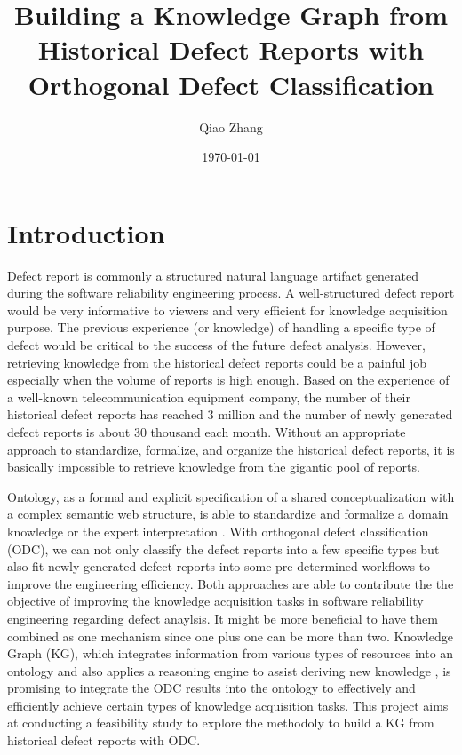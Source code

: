 \documentclass[12pt] {article}
\begin{document}
\title{Building a Knowledge Graph from Historical Defect Reports with Orthogonal Defect Classification}
\author{Qiao Zhang}
\date \today
\maketitle

\thispagestyle{empty}

\bigskip
\pagebreak
\setcounter{page}{1}
\section{Introduction}
Defect report is commonly a structured natural language artifact generated during the software reliability engineering process.
A well-structured defect report would be very informative to viewers and very efficient for knowledge acquisition purpose.
The previous experience (or knowledge) of handling a specific type of defect would be critical to the success of the future defect analysis.
However, retrieving knowledge from the historical defect reports could be a painful job especially when the volume of reports is high enough.
Based on the experience of a well-known telecommunication equipment company, the number of their historical defect reports has reached 3 million and the number of newly generated defect reports is about 30 thousand each month.
Without an appropriate approach to standardize, formalize, and organize the historical defect reports, it is basically impossible to retrieve knowledge from the gigantic pool of reports.\par

Ontology, as a formal and explicit specification of a shared conceptualization with a complex semantic web structure, is able to standardize and formalize a domain knowledge or the expert interpretation \cite{christina2016an}.
With orthogonal defect classification (ODC), we can not only classify the defect reports into a few specific types but also fit newly generated defect reports into some pre-determined workflows to improve the engineering efficiency.
Both approaches are able to contribute the the objective of improving the knowledge acquisition tasks in software reliability engineering regarding defect anaylsis. 
It might be more beneficial to have them combined as one mechanism since one plus one can be more than two.
Knowledge Graph (KG), which integrates information from various types of resources into an ontology and also applies a reasoning engine to assist deriving new knowledge \cite{ehrlinger2016towards}, is promising to integrate the ODC results into the ontology to effectively and efficiently achieve certain types of knowledge acquisition tasks.
This project aims at conducting a feasibility study to explore the methodoly to build a KG from historical defect reports with ODC.
\end{document}
